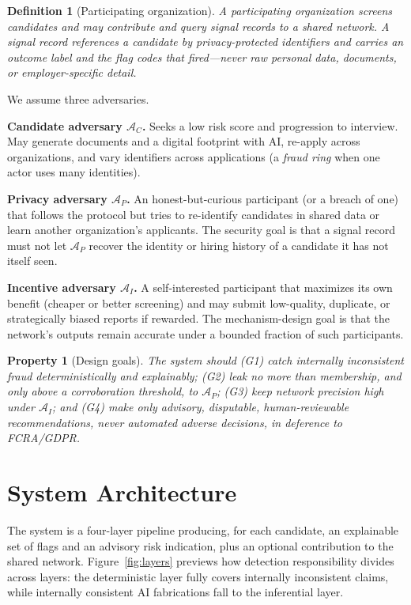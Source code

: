 \documentclass[11pt]{article}
\newtheorem{definition}{Definition}
\newtheorem{property}{Property}
\begin{document}
\begin{definition}[Participating organization]
A participating organization screens candidates and may contribute and query
\emph{signal records} to a shared network. A signal record references a candidate
by privacy-protected identifiers and carries an outcome label and the flag codes
that fired---never raw personal data, documents, or employer-specific detail.
\end{definition}

We assume three adversaries.

\noindent\textbf{Candidate adversary $\mathcal{A}_C$.} Seeks a low risk score and
progression to interview. May generate documents and a digital footprint with AI,
re-apply across organizations, and vary identifiers across applications (a
\emph{fraud ring} when one actor uses many identities).

\noindent\textbf{Privacy adversary $\mathcal{A}_P$.} An honest-but-curious
participant (or a breach of one) that follows the protocol but tries to
re-identify candidates in shared data or learn another organization's applicants.
The security goal is that a signal record must not let $\mathcal{A}_P$ recover the
identity or hiring history of a candidate it has not itself seen.

\noindent\textbf{Incentive adversary $\mathcal{A}_I$.} A self-interested
participant that maximizes its own benefit (cheaper or better screening) and may
submit low-quality, duplicate, or strategically biased reports if rewarded. The
mechanism-design goal is that the network's outputs remain accurate under a
bounded fraction of such participants.

\begin{property}[Design goals]\label{prop:goals}
The system should (G1) catch internally inconsistent fraud deterministically and
explainably; (G2) leak no more than membership, and only above a corroboration
threshold, to $\mathcal{A}_P$; (G3) keep network precision high under
$\mathcal{A}_I$; and (G4) make only advisory, disputable, human-reviewable
recommendations, never automated adverse decisions, in deference to FCRA/GDPR.
\end{property}

\section{System Architecture}\label{sec:arch}
The system is a four-layer pipeline producing, for each candidate, an explainable
set of flags and an advisory risk indication, plus an optional contribution to
the shared network. Figure~\ref{fig:layers} previews how detection responsibility
divides across layers: the deterministic layer fully covers internally
inconsistent claims, while internally consistent AI fabrications fall to the
inferential layer.
\end{document}
